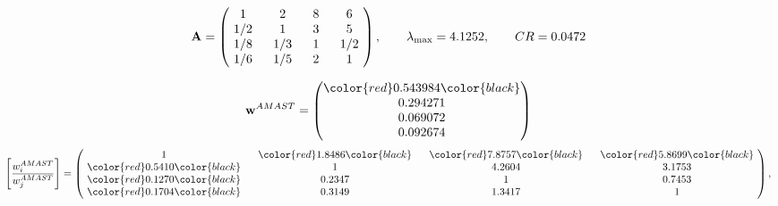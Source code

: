 \begin{example}
\begin{equation*}
\mathbf{A} =
\begin{pmatrix}
$\,\,$ 1 $\,\,$ & $\,\,$2$\,\,$ & $\,\,$8$\,\,$ & $\,\,$6 $\,\,$ \\
$\,\,$ 1/2$\,\,$ & $\,\,$ 1 $\,\,$ & $\,\,$3$\,\,$ & $\,\,$5 $\,\,$ \\
$\,\,$ 1/8$\,\,$ & $\,\,$ 1/3$\,\,$ & $\,\,$ 1 $\,\,$ & $\,\,$ 1/2 $\,\,$ \\
$\,\,$ 1/6$\,\,$ & $\,\,$ 1/5$\,\,$ & $\,\,$2$\,\,$ & $\,\,$ 1  $\,\,$ \\
\end{pmatrix},
\qquad
\lambda_{\max} =
4.1252,
\qquad
CR = 0.0472
\end{equation*}

\begin{equation*}
\mathbf{w}^{AMAST} =
\begin{pmatrix}
\color{red} 0.543984\color{black} \\
0.294271\\
0.069072\\
0.092674
\end{pmatrix}\end{equation*}
\begin{equation*}
\left[ \frac{{w}^{AMAST}_i}{{w}^{AMAST}_j} \right] =
\begin{pmatrix}
$\,\,$ 1 $\,\,$ & $\,\,$\color{red} 1.8486\color{black} $\,\,$ & $\,\,$\color{red} 7.8757\color{black} $\,\,$ & $\,\,$\color{red} 5.8699\color{black} $\,\,$ \\
$\,\,$\color{red} 0.5410\color{black} $\,\,$ & $\,\,$ 1 $\,\,$ & $\,\,$4.2604$\,\,$ & $\,\,$3.1753  $\,\,$ \\
$\,\,$\color{red} 0.1270\color{black} $\,\,$ & $\,\,$0.2347$\,\,$ & $\,\,$ 1 $\,\,$ & $\,\,$0.7453 $\,\,$ \\
$\,\,$\color{red} 0.1704\color{black} $\,\,$ & $\,\,$0.3149$\,\,$ & $\,\,$1.3417$\,\,$ & $\,\,$ 1  $\,\,$ \\
\end{pmatrix},
\end{equation*}


\end{example}
